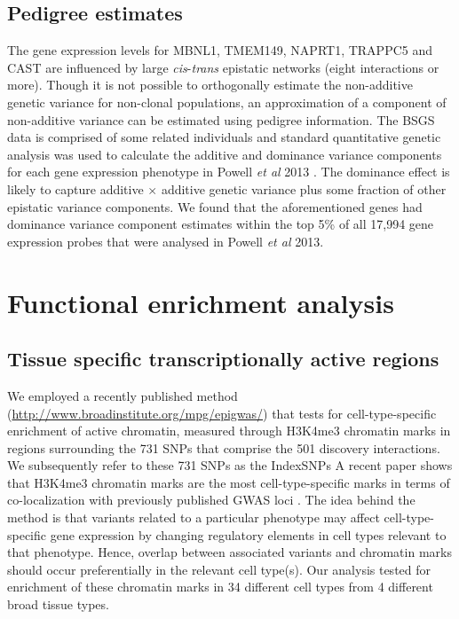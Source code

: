 \documentclass{article}
\begin{document}
\subsection{Pedigree estimates}

The gene expression levels for MBNL1, TMEM149, NAPRT1, TRAPPC5 and CAST are influenced by large \emph{cis}-\emph{trans} epistatic networks (eight interactions or more). Though it is not possible to orthogonally estimate the non-additive genetic variance for non-clonal populations, an approximation of a component of non-additive variance can be estimated using pedigree information. The BSGS data is comprised of some related individuals and standard quantitative genetic analysis was used to calculate the additive and dominance variance components for each gene expression phenotype in Powell \emph{et al} 2013 \cite{Powell2013}. The dominance effect is likely to capture additive $\times$ additive genetic variance plus some fraction of other epistatic variance components. We found that the aforementioned genes had dominance variance component estimates within the top 5\% of all 17,994 gene expression probes that were analysed in Powell \emph{et al} 2013.


\section{Functional enrichment analysis}

\subsection{Tissue specific transcriptionally active regions}

We employed a recently published method (\url{http://www.broadinstitute.org/mpg/epigwas/}) \cite{Trynka2013} that tests for cell-type-specific enrichment of active chromatin, measured through H3K4me3 chromatin marks \cite{Koch2007} in regions surrounding the 731 SNPs that comprise the 501 discovery interactions. We subsequently refer to these 731 SNPs as the IndexSNPs A recent paper shows that H3K4me3 chromatin marks are the most cell-type-specific marks in terms of co-localization with previously published GWAS loci \cite{Trynka2013}. The idea behind the method is that variants related to a particular phenotype may affect cell-type-specific gene expression by changing regulatory elements in cell types relevant to that phenotype. Hence, overlap between associated variants and chromatin marks should occur preferentially in the relevant cell type(s). Our analysis tested for enrichment of these chromatin marks in 34 different cell types from 4 different broad tissue types.
\end{document}
